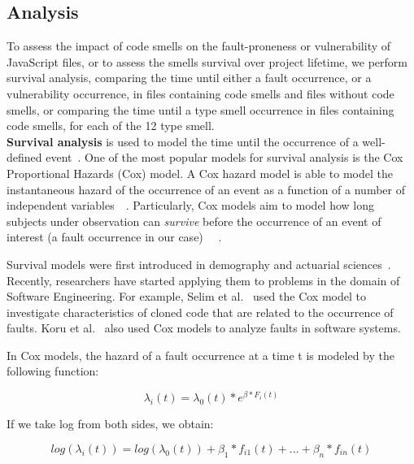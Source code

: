 \subsection{Analysis}\label{survival}
To assess the impact of code smells on the fault-proneness {\color{blue}or vulnerability of JavaScript files, or to assess the smells survival over project lifetime,} we perform survival analysis, comparing the time until {\color{blue}either a fault occurrence, or a vulnerability occurrence}, in files containing code smells and files without code smells, {\color{blue}or comparing the time until a type smell occurrence in files containing code smells, for each of the 12 type smell.}\\
\textbf{Survival analysis} is used to model the time until the occurrence of a well-defined event~\cite{fox2010r}. One of the most popular models for survival analysis is the Cox Proportional Hazards (Cox) model. A Cox hazard model is able to model the instantaneous hazard of the occurrence of an event as a function of a number of independent variables~\cite{koru2008theory}~\cite{singer2003applied}. Particularly, Cox models aim to model how long subjects under observation can \textsl{survive} before the occurrence of an event of interest (a fault occurrence in our case) ~\cite{singer2003applied}~\cite{selim2010studying}.
\begin{sloppypar}
Survival models were first introduced in demography and actuarial sciences~\cite{Westergaard}. Recently, researchers have started applying them to problems in the domain of Software Engineering. For example, Selim et al.~\cite{selim2010studying} used the Cox model to investigate characteristics of cloned code that are related to the occurrence of faults. Koru et al.~\cite{koru2007modeling} also used Cox models to analyze faults in software systems. 
\end{sloppypar}%
In Cox models, the hazard of a fault occurrence at a time t is modeled by the following function:

\begin{equation}\label{eq1}
\lambda_{i}(t) = \lambda_{0}(t)* e ^ {\beta*{F_{i}}(t)}
\end{equation}

If we take log from both sides, we obtain:

\begin{equation}\label{eq2}
log(\lambda_{i}(t)) = log(\lambda_{0}(t)) + {\beta_{1}*{f_{i1}}(t)} + ... + {\beta_{n}*{f_{in}}(t)}
\end{equation}

